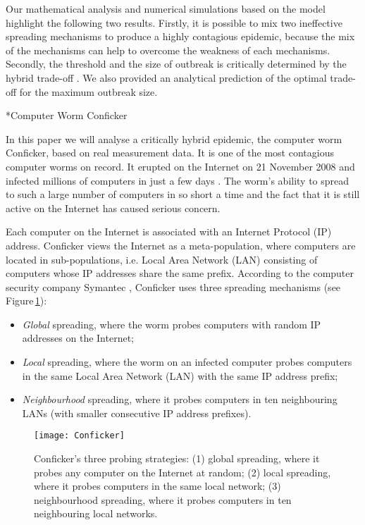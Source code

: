 \documentclass[9pt]{article}
\makeatletter
\newcommand{\reffig}[1]{Figure\,\ref{#1}}
\renewcommand{\section}{\@startsection {section}{1}{0pt}{-6pt}{1pt}{\reset@font \large \bfseries}}
\makeatother
\begin{document}
Our mathematical analysis and numerical simulations based on the model highlight the following two results. 
{Firstly, it is possible to mix two ineffective spreading mechanisms to produce a highly contagious epidemic, because the mix of the mechanisms can help to overcome the weakness of each mechanisms. 
Secondly, the threshold and the size of outbreak is critically determined by the hybrid trade-off . We also provided an analytical prediction of the optimal trade-off for the maximum outbreak size. 
}


\section*{Computer Worm Conficker}

In this paper we will analyse a critically hybrid epidemic, the computer worm Conficker, based on real measurement data. 
It is one of the most contagious computer worms on record. It erupted on the Internet on 21 November 2008 and infected millions of computers in just a few days \cite{Shin_2012}. 
The worm's ability to spread to such a large number of computers in so short a time and the fact \cite{ESET_Conficker} that it is still active on the Internet has caused serious concern. 

Each computer on the Internet is associated with an Internet Protocol (IP) address. Conficker views the Internet as a meta-population, where computers are located in sub-populations, i.e. Local Area Network (LAN) consisting of computers whose IP addresses share the same prefix. 
According to the computer security company Symantec \cite{Eric_2010}, Conficker uses three spreading mechanisms (see \reffig{fig-Conficker}):
\begin{itemize}
\item {\em Global} spreading, where the worm probes computers with random IP addresses on the Internet; 
\item {\em Local} spreading, where the worm on an infected computer probes computers in the same Local Area Network (LAN) with the same IP address prefix; 
\item {\em Neighbourhood} spreading, where it probes computers in ten neighbouring LANs (with smaller consecutive IP address prefixes). 
\end{itemize}

\begin{figure}[h]
\centering\small
\texttt{[image: Conficker]} 
\caption{\label{fig-Conficker}Conficker's three probing strategies: (1) global spreading, where it probes any computer on the Internet at random;  (2) local spreading, where it probes computers in the same local network; (3) neighbourhood spreading, where it probes computers in ten neighbouring local networks.}
\end{figure}
\end{document}
